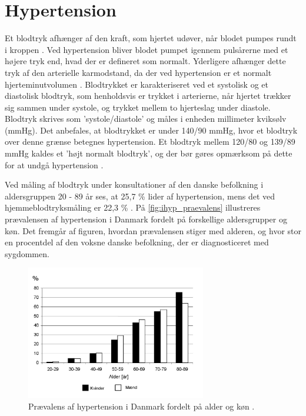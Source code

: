 \section{Hypertension} \label{sec:hypertension}

Et blodtryk afhænger af den kraft, som hjertet udøver, når blodet pumpes rundt i kroppen \citep{martini2015}. Ved hypertension bliver blodet pumpet igennem pulsårerne med et højere tryk end, hvad der er defineret som normalt. Yderligere afhænger dette tryk af den arterielle karmodstand, da der ved hypertension er et normalt hjerteminutvolumen \citep{olsen2015}. 
Blodtrykket er karakteriseret ved et systolisk og et diastolisk blodtryk, som henholdsvis er trykket i arterierne, når hjertet trækker sig sammen under systole, og trykket mellem to hjerteslag under diastole. Blodtryk skrives som 'systole/diastole' og måles i enheden millimeter kviksølv (mmHg). Det anbefales, at blodtrykket er under 140/90 mmHg, hvor et blodtryk over denne grænse betegnes hypertension. Et blodtryk mellem 120/80 og 139/89 mmHg kaldes et 'højt normalt blodtryk', og der bør gøres opmærksom på dette for at undgå hypertension \cite{martini2015}.
  
Ved måling af blodtryk under konsultationer af den danske befolkning i aldersgruppen 20 - 89 år ses, at 25,7 \% lider af hypertension, mens det ved hjemmeblodtryksmåling er 22,3 \% \cite{kronborg2008}. På \autoref{fig:ihyp_praevalens} illustreres  prævalensen af hypertension i Danmark fordelt på forskellige aldersgrupper og køn. Det fremgår af figuren, hvordan prævalensen stiger med alderen, og hvor stor en procentdel af den voksne danske befolkning, der er diagnosticeret med sygdommen.

\begin{figure}[H]
\centering
\includegraphics[width=0.7\textwidth]{figures/hyp_praevalens}
\caption{Prævalens af hypertension i Danmark fordelt på alder og køn \citep{kronborg2008}.}
\label{fig:ihyp_praevalens}
\end{figure}

